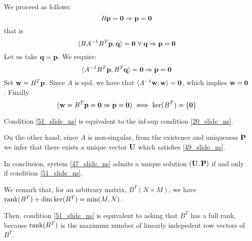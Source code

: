 We proceed as follows: 
\[
    R\textbf{p} = \textbf{0} \Rightarrow \textbf{p} = \textbf{0}
\]
that is 
\[
    \langle BA^{-1}B^T\textbf{p},\textbf{q} \rangle = \textbf{0} \ \forall \; \textbf{q} \Rightarrow \textbf{p} = \textbf{0}
\]
Let us take \(\textbf{q} = \textbf{p}\). We require:
\[
    \langle A^{-1}B^T \textbf{p},B^T\textbf{q} \rangle = \textbf{0} \Rightarrow \textbf{p} = \textbf{0}
\]
Set \(\textbf{w} = B^T \textbf{p}\). Since \(A\) is spd, we have that \(\langle A^{-1}\textbf{w},\textbf{w} \rangle = \textbf{0}\), which implies \(\textbf{w} = \textbf{0}\). Finally
\[
    (\textbf{w} = B^T \textbf{p} = \textbf{0} \Rightarrow \textbf{p} = \textbf{0}) \iff \ker (B^T) =  \left\{ \textbf{0} \right\}
\]
\begin{remark}
    Condition \eqref{51_slide_ns} is equivalent to the inf-sup condition \eqref{20_slide_ns}.
\end{remark}
On the other hand, since \(A\) is non-singular, from the existence and uniqueness \(\textbf{P}\) we infer that there exists a unique vector \(\textbf{U}\) which satisfies \eqref{49_slide_ns}. 

In conclusion, system \eqref{47_slide_ns} admits a unique solution \((\textbf{U}, \textbf{P})\) if and only if condition \eqref{51_slide_ns}. 

\begin{remark}
    We remark that, for an arbitrary matrix, \(B^T (N\times M)\), we have \(\rank(B^T) + \dim \ker (B^T) = \min(M,N)\). 
    
    Then, condition \eqref{51_slide_ns} is equivalent to asking that \(B^T\) has a full rank, because \(\rank(B^T)\) is the maximum number of linearly indepedent row vectors of \(B^T\).
\end{remark}